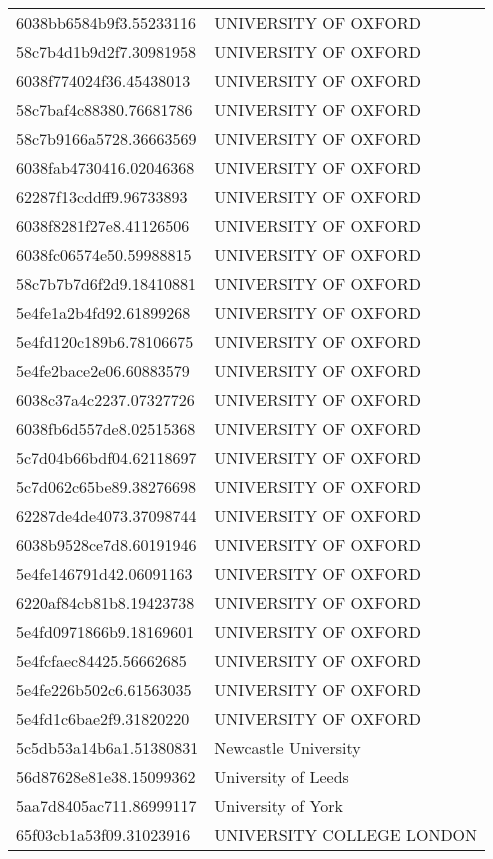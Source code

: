 \begin{tabular}{ll}
6038bb6584b9f3.55233116 & UNIVERSITY OF OXFORD \\
58c7b4d1b9d2f7.30981958 & UNIVERSITY OF OXFORD \\
6038f774024f36.45438013 & UNIVERSITY OF OXFORD \\
58c7baf4c88380.76681786 & UNIVERSITY OF OXFORD \\
58c7b9166a5728.36663569 & UNIVERSITY OF OXFORD \\
6038fab4730416.02046368 & UNIVERSITY OF OXFORD \\
62287f13cddff9.96733893 & UNIVERSITY OF OXFORD \\
6038f8281f27e8.41126506 & UNIVERSITY OF OXFORD \\
6038fc06574e50.59988815 & UNIVERSITY OF OXFORD \\
58c7b7b7d6f2d9.18410881 & UNIVERSITY OF OXFORD \\
5e4fe1a2b4fd92.61899268 & UNIVERSITY OF OXFORD \\
5e4fd120c189b6.78106675 & UNIVERSITY OF OXFORD \\
5e4fe2bace2e06.60883579 & UNIVERSITY OF OXFORD \\
6038c37a4c2237.07327726 & UNIVERSITY OF OXFORD \\
6038fb6d557de8.02515368 & UNIVERSITY OF OXFORD \\
5c7d04b66bdf04.62118697 & UNIVERSITY OF OXFORD \\
5c7d062c65be89.38276698 & UNIVERSITY OF OXFORD \\
62287de4de4073.37098744 & UNIVERSITY OF OXFORD \\
6038b9528ce7d8.60191946 & UNIVERSITY OF OXFORD \\
5e4fe146791d42.06091163 & UNIVERSITY OF OXFORD \\
6220af84cb81b8.19423738 & UNIVERSITY OF OXFORD \\
5e4fd0971866b9.18169601 & UNIVERSITY OF OXFORD \\
5e4fcfaec84425.56662685 & UNIVERSITY OF OXFORD \\
5e4fe226b502c6.61563035 & UNIVERSITY OF OXFORD \\
5e4fd1c6bae2f9.31820220 & UNIVERSITY OF OXFORD \\
5c5db53a14b6a1.51380831 & Newcastle University \\
56d87628e81e38.15099362 & University of Leeds \\
5aa7d8405ac711.86999117 & University of York \\
65f03cb1a53f09.31023916 & UNIVERSITY COLLEGE LONDON \\

\end{tabular}
